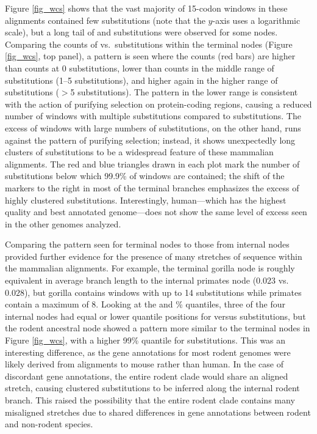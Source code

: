 Figure \ref{fig_wcs} shows that the vast majority of 15-codon windows
in these alignments contained few substitutions (note that the
$y$-axis uses a logarithmic scale), but a long tail of \nsyn and \syn
substitutions were observed for some nodes. Comparing the counts of
\nsyn vs.\ \syn substitutions within the terminal nodes (Figure
\ref{fig_wcs}, top panel), a pattern is seen where the \nsyn counts
(red bars) are higher than \syn counts at 0 substitutions, lower than
\syn counts in the middle range of substitutions (1--5 substitutions),
and higher again in the higher range of substitutions ($>$5
substitutions). The pattern in the lower range is consistent with the
action of purifying selection on protein-coding regions, causing a
reduced number of windows with multiple \nsyn substitutions compared
to \syn substitutions. The excess of windows with large numbers of
\nsyn substitutions, on the other hand, runs against the pattern of
purifying selection; instead, it shows unexpectedly long clusters of
\nsyn substitutions to be a widespread feature of these mammalian
alignments. The red and blue triangles drawn in each plot mark the
number of substitutions below which 99.9\% of windows are contained;
the shift of the \nsyn markers to the right in most of the terminal
branches emphasizes the excess of highly clustered \nsyn
substitutions. Interestingly, human---which has the highest quality
and best annotated genome---does not show the same level of excess
seen in the other genomes analyzed.

Comparing the pattern seen for terminal nodes to those from internal
nodes provided further evidence for the presence of many stretches of
\nhom sequence within the mammalian alignments. For example, the
terminal gorilla node is roughly equivalent in average branch length
to the internal primates node ($0.023$ vs.\ $0.028$), but gorilla
contains windows with up to 14 \nsyn substitutions while primates
contain a maximum of 8. Looking at the \nsyn and \%
quantiles, three of the four internal nodes had equal or lower
quantile positions for \nsyn versus \syn substitutions, but the rodent
ancestral node showed a pattern more similar to the terminal nodes in
Figure \ref{fig_wcs}, with a higher 99\% quantile for \nsyn
substitutions. This was an interesting difference, as the gene
annotations for most rodent genomes were likely derived from
alignments to mouse rather than human. In the case of discordant gene
annotations, the entire rodent clade would share an aligned \nhom
stretch, causing clustered substitutions to be inferred along the
internal rodent branch. This raised the possibility that the entire
rodent clade contains many misaligned \nhom stretches due to shared
differences in gene annotations between rodent and non-rodent species.

